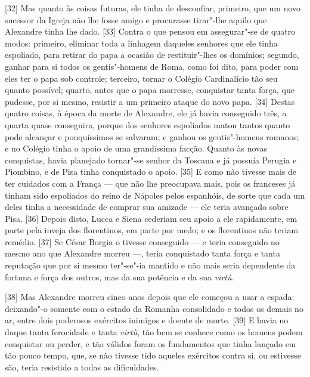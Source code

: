 {[}32{]} Mas quanto às coisas futuras, ele tinha de desconfiar,
primeiro, que um novo sucessor da Igreja não lhe fosse amigo e
procurasse tirar"-lhe aquilo que Alexandre tinha lhe dado. {[}33{]}
Contra o que pensou em assegurar"-se de quatro modos: primeiro, eliminar
toda a linhagem daqueles senhores que ele tinha espoliado, para retirar
do papa a ocasião de restituir"-lhes os domínios; segundo, ganhar para si
todos os gentis"-homens de Roma, como foi dito, para poder
com eles ter o papa sob controle; terceiro, tornar o Colégio
Cardinalício tão seu quanto possível; quarto,
antes que o papa morresse, conquistar tanta força, que pudesse, por si
mesmo, resistir a um primeiro ataque do novo papa. {[}34{]} Destas
quatro coisas, à época da morte de Alexandre, ele já havia conseguido
três, a quarta quase conseguira, porque dos senhores espoliados matou
tantos quanto pode alcançar e pouquíssimos se salvaram; e ganhou os
gentis"-homens romanos; e no Colégio tinha o apoio de uma grandíssima
facção. Quanto às novas conquistas, havia planejado tornar"-se senhor da
Toscana e já possuía Perugia e Piombino, e de Pisa tinha conquistado o
apoio. {[}35{]} E como não tivesse mais de ter cuidados com a França ---
que não lhe preocupava mais, pois os franceses já tinham sido espoliados
do reino de Nápoles pelos espanhóis, de sorte que cada um deles tinha a
necessidade de comprar sua amizade --- ele teria avançado sobre Pisa.
{[}36{]} Depois disto, Lucca e Siena cederiam seu apoio a ele
rapidamente, em parte pela inveja dos florentinos, em parte por medo; e
os florentinos não teriam remédio. {[}37{]} Se César Borgia o tivesse
conseguido --- e teria conseguido no mesmo ano que Alexandre morreu ---,
teria conquistado tanta força e tanta reputação que por si mesmo
ter"-se"-ia mantido e não mais seria dependente da fortuna e força dos
outros, mas da sua potência e da sua \emph{virtù}.

{[}38{]} Mas Alexandre morreu cinco anos depois que ele começou a usar a
espada: deixando"-o somente com o estado da Romanha consolidado e todos
os demais no ar, entre dois poderosos exércitos inimigos e doente de
morte. {[}39{]} E havia no
duque tanta ferocidade e tanta \emph{virtù}, tão bem se conhece como os
homens podem conquistar ou perder, e tão válidos foram os fundamentos
que tinha lançado em tão pouco tempo, que, se não tivesse tido aqueles
exércitos contra si, ou estivesse são, teria resistido a todas as
dificuldades.

